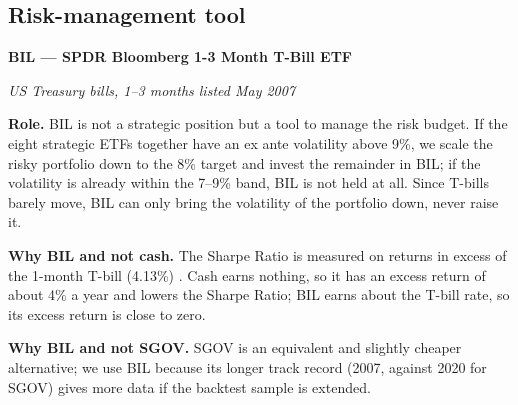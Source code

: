\subsection*{Risk-management tool}\label{sec:risk-tool}

\textbf{BIL --- SPDR Bloomberg 1-3 Month T-Bill ETF}

\emph{US Treasury bills, 1--3 months \textperiodcentered{} listed May 2007}

\textbf{Role.} BIL is not a strategic position but a tool to manage the
risk budget. If the eight strategic ETFs together have an ex ante
volatility above 9\%, we scale the risky portfolio down to the 8\%
target and invest the remainder in BIL; if the volatility is already
within the 7--9\% band, BIL is not held at all. Since T-bills barely
move, BIL can only bring the volatility of the portfolio down, never
raise it.

\textbf{Why BIL and not cash.} The Sharpe Ratio is measured on returns
in excess of the 1-month T-bill (4.13\%) \cite{ustreasury}. Cash earns nothing, so
it has an excess return of about \textminus{}4\% a year and lowers the Sharpe
Ratio; BIL earns about the T-bill rate, so its excess return is close to
zero.

\textbf{Why BIL and not SGOV.} SGOV is an equivalent and slightly
cheaper alternative; we use BIL because its longer track record (2007,
against 2020 for SGOV) gives more data if the backtest sample is
extended.
